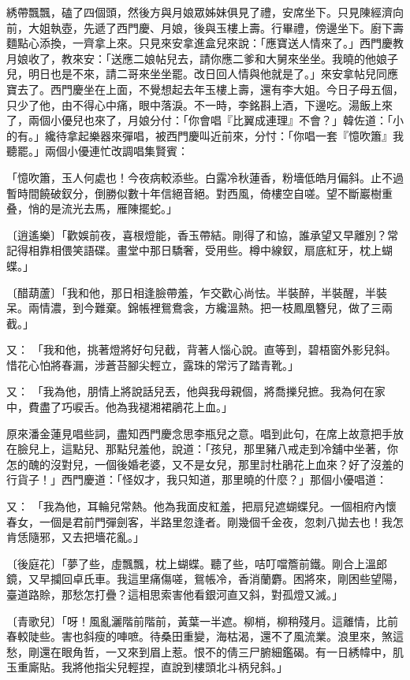 綉帶飄飄，磕了四個頭，然後方與月娘眾姊妹俱見了禮，安席坐下。只見陳經濟向前，大姐執壺，先遞了西門慶、月娘，後與玉樓上壽。行畢禮，傍邊坐下。廚下壽麵點心添換，一齊拿上來。只見來安拿進盒兒來說：「應寶送人情來了。」西門慶教月娘收了，教來安：「送應二娘帖兒去，請你應二爹和大舅來坐坐。我曉的他娘子兒，明日也是不來，請二哥來坐坐罷。改日回人情與他就是了。」來安拿帖兒同應寶去了。西門慶坐在上面，不覺想起去年玉樓上壽，還有李大姐。今日子母五個，只少了他，由不得心中痛，眼中落淚。不一時，李銘斟上酒，下邊吃。湯飯上來了，兩個小優兒也來了，月娘分付：「你會唱『比翼成連理』不會？」韓佐道：「小的有。」纔待拿起樂器來彈唱，被西門慶叫近前來，分忖：「你唱一套『憶吹簫』我聽罷。」兩個小優連忙改調唱集賢賓：

「憶吹簫，玉人何處也！今夜病較添些。白露冷秋蓮香，粉墻低皓月偏斜。止不過暫時間饒破釵分，倒勝似數十年信絕音絕。對西風，倚樓空自嗟。望不斷巖樹重叠，悄的是流光去馬，雁陳擺蛇。」

〔逍遙樂〕「歡娛前夜，喜根燈能，香玉帶結。剛得了和協，誰承望又早離別？常記得相靠相偎笑語碟。畫堂中那日驕奢，受用些。樽中線釵，扇底紅牙，枕上蝴蝶。」

〔醋葫蘆〕「我和他，那日相逢臉帶羞，乍交歡心尚怯。半裝醉，半裝醒，半裝呆。兩情濃，到今難棄。錦帳裡鴛鴦衾，方纔溫熱。把一枝鳳凰簪兒，做了三兩截。」

又：  「我和他，挑著燈將好句兒截，背著人惱心說。直等到，碧梧窗外影兒斜。惜花心怕將春漏，涉蒼苔腳尖輕立，露珠的常污了踏青靴。」

又：  「我為他，朋情上將說話兒丟，他與我母親個，將喬擽兒摭。我為何在家中，費盡了巧唳舌。他為我褪湘裙鵑花上血。」

原來潘金蓮見唱些詞，盡知西門慶念思李瓶兒之意。唱到此句，在席上故意把手放在臉兒上，這點兒、那點兒羞他，說道：「孩兒，那里豬八戒走到冷舖中坐著，你怎的醜的沒對兒，一個後婚老婆，又不是女兒，那里討杜鵑花上血來？好了沒羞的行貨子！」西門慶道：「怪奴才，我只知道，那里曉的什麼？」那個小優唱道：

又：  「我為他，耳輪兒常熱。他為我面皮紅羞，把扇兒遮蝴蝶兒。一個相府內懷春女，一個是君前門彈劍客，半路里忽逢者。剛幾個千金夜，忽刺八拋去也！我怎肯恁隨邪，又去把墻花亂。」

〔後庭花〕「夢了些，虛飄飄，枕上蝴蝶。聽了些，咭叮噹簷前鐵。剛合上溫郎鏡，又早攔回卓氏車。我這里痛傷嗟，鴛帳冷，香消蘭麝。困將來，剛困些望陽，臺道路賒，那愁怎打疊？這相思索害他看銀河直又斜，對孤燈又滅。」

〔青歌兒〕「呀！風亂灑階前階前，黃葉一半遮。柳梢，柳稍殘月。這離情，比前春較陡些。害也斜瘦的唓嗻。待桑田重變，海枯渴，還不了風流業。浪里來，煞這愁，剛還在眼角哲，一又來到眉上惹。恨不的倩三尸腑細鑑碣。有一日綉幃中，肌玉重廝貼。我將他指尖兒輕捏，直說到樓頭北斗柄兒斜。」

